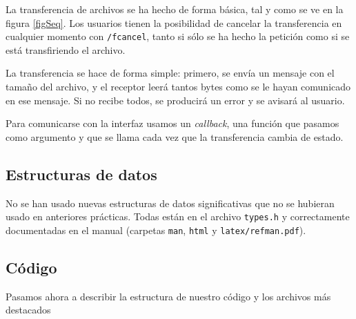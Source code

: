 \documentclass{article}
\begin{document}
La transferencia de archivos se ha hecho de forma básica, tal y como se ve en la figura \ref{figSeq}. Los usuarios tienen la posibilidad de cancelar la transferencia en cualquier momento con \texttt{/fcancel}, tanto si sólo se ha hecho la petición como si se está transfiriendo el archivo.

La transferencia se hace de forma simple: primero, se envía un mensaje con el tamaño del archivo, y el receptor leerá tantos bytes como se le hayan comunicado en ese mensaje. Si no recibe todos, se producirá un error y se avisará al usuario. 

Para comunicarse con la interfaz usamos un \textit{callback}, una función que pasamos como argumento y que se llama cada vez que la transferencia cambia de estado.

\subsection{Estructuras de datos}

No se han usado nuevas estructuras de datos significativas que no se hubieran usado en anteriores prácticas. Todas están en el archivo \texttt{types.h} y correctamente documentadas en el manual (carpetas \texttt{man}, \texttt{html} y \texttt{latex/refman.pdf}).

\subsection{Código}

Pasamos ahora a describir la estructura de nuestro código y los archivos más destacados
\end{document}
